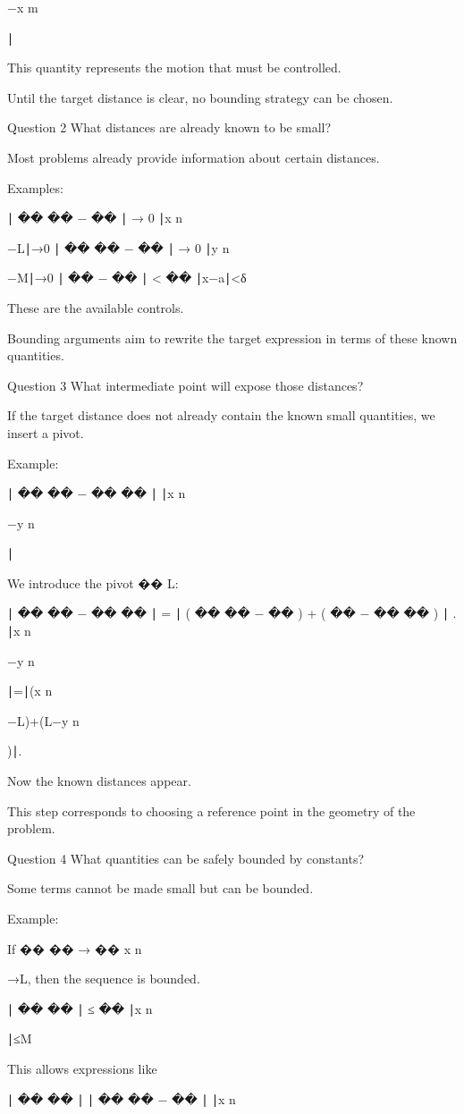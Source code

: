 −x
m
	​

∣

This quantity represents the motion that must be controlled.

Until the target distance is clear, no bounding strategy can be chosen.

Question 2
What distances are already known to be small?

Most problems already provide information about certain distances.

Examples:

∣
��
��
−
��
∣
→
0
∣x
n
	​

−L∣→0
∣
��
��
−
��
∣
→
0
∣y
n
	​

−M∣→0
∣
��
−
��
∣
<
��
∣x−a∣<δ

These are the available controls.

Bounding arguments aim to rewrite the target expression in terms of these known quantities.

Question 3
What intermediate point will expose those distances?

If the target distance does not already contain the known small quantities, we insert a pivot.

Example:

∣
��
��
−
��
��
∣
∣x
n
	​

−y
n
	​

∣

We introduce the pivot 
��
L:

∣
��
��
−
��
��
∣
=
∣
(
��
��
−
��
)
+
(
��
−
��
��
)
∣
.
∣x
n
	​

−y
n
	​

∣=∣(x
n
	​

−L)+(L−y
n
	​

)∣.

Now the known distances appear.

This step corresponds to choosing a reference point in the geometry of the problem.

Question 4
What quantities can be safely bounded by constants?

Some terms cannot be made small but can be bounded.

Example:

If 
��
��
→
��
x
n
	​

→L, then the sequence is bounded.

∣
��
��
∣
≤
��
∣x
n
	​

∣≤M

This allows expressions like

∣
��
��
∣
∣
��
��
−
��
∣
∣x
n
	​

